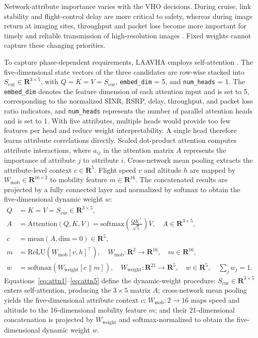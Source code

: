 \documentclass[remotesensing,article,submit,moreauthors]{Definitions/mdpi}
\begin{document}
Network-attribute importance varies with the VHO decisions. During cruise, link stability and flight-control delay are more critical to safety, whereas during image return at imaging sites, throughput and packet loss become more important for timely and reliable transmission of high-resolution images \citep{ref25}. Fixed weights cannot capture these changing priorities.

To capture phase-dependent requirements, LAAVHA employs self-attention \citep{ref26,ref27}. The five-dimensional state vectors of the three candidates are row-wise stacked into $S_{\mathrm{cur}}\in\mathbf{R}^{3\times5}$, with $Q=K=V=S_{\mathrm{cur}}$, \texttt{embed\_dim} = 5, and \texttt{num\_heads} = 1. The \texttt{embed\_dim} denotes the feature dimension of each attention input and is set to 5, corresponding to the normalized SINR, RSRP, delay, throughput, and packet loss ratio indicators, and \texttt{num\_heads} represents the number of parallel attention heads and is set to 1. With five attributes, multiple heads would provide too few features per head and reduce weight interpretability. A single head therefore learns attribute correlations directly. Scaled dot-product attention computes attribute interactions, where $a_{ij}$ in the attention matrix $A$ represents the importance of attribute $j$ to attribute $i$. Cross-network mean pooling extracts the attribute-level context $c\in\mathbf{R}^5$. Flight speed $v$ and altitude $h$ are mapped by $W_{\mathrm{mob}}\in\mathbf{R}^{16\times2}$ to mobility feature $m\in\mathbf{R}^{16}$. The concatenated results are projected by a fully connected layer and normalized by softmax to obtain the five-dimensional dynamic weight $w$:
\begin{align}
Q &= K = V = S_{\mathrm{cur}}\in\mathbf{R}^{3\times5}, \label{eq:attn1}\\
A &= \mathrm{Attention}(Q,K,V)=\mathrm{softmax}\!\left(\frac{QK^\top}{\sqrt{5}}\right)V,\quad A\in\mathbf{R}^{3\times5}, \label{eq:attn2}\\
c &= \mathrm{mean}(A,\mathrm{dim}=0)\in\mathbf{R}^5, \label{eq:attn3}\\
m &= \mathrm{ReLU}\!\left(W_{\mathrm{mob}}[v,h]^\top\right),\quad W_{\mathrm{mob}}:\mathbf{R}^{2}\rightarrow\mathbf{R}^{16},\quad m\in\mathbf{R}^{16}, \label{eq:attn4}\\
w &= \mathrm{softmax}\!\left(W_{\mathrm{weight}}[c\parallel m]\right),\quad W_{\mathrm{weight}}:\mathbf{R}^{21}\rightarrow\mathbf{R}^{5},\quad w\in\mathbf{R}^{5},\quad \sum_j w_j=1. \label{eq:attn5}
\end{align}
Equations~\eqref{eq:attn1}--\eqref{eq:attn5} define the dynamic-weight procedure: $S_{\mathrm{cur}}\in\mathbf{R}^{3\times5}$ enters self-attention, producing the $3\times5$ matrix $A$; cross-network mean pooling yields the five-dimensional attribute context $c$; $W_{\mathrm{mob}}:2\rightarrow16$ maps speed and altitude to the 16-dimensional mobility feature $m$; and their 21-dimensional concatenation is projected by $W_{\mathrm{weight}}$ and softmax-normalized to obtain the five-dimensional dynamic weight $w$.
\end{document}
